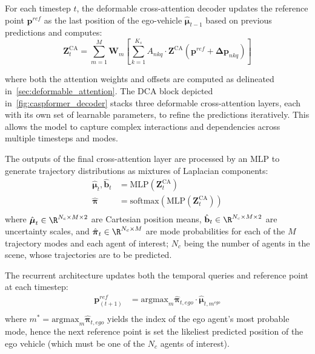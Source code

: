 \begin{description}[leftmargin=1em,itemsep=2pt]
\begin{description}[leftmargin=1em,itemsep=2pt]
For each timestep \(t\), the deformable cross-attention decoder updates the reference point \(\mathbf{p}^{ref}\) as the last position of the ego-vehicle \( \hat{\boldsymbol{\mu}}_{t-1}\) based on previous predictions and computes:
\begin{equation}
\label{eq:cross_attention_operation}
\mathbf{Z}^{\text{CA}}_t = \sum_{m=1}^{M} \mathbf{W}_m \left[ \sum_{k=1}^{K_s} A_{nkq} \cdot \mathbf{Z}^{\text{CA}}(\mathbf{p}^{ref} + \boldsymbol{\Delta p}_{nkq}) \right]
\end{equation}

where both the attention weights and offsets are computed as delineated in~\autoref{sec:deformable_attention}. The DCA block depicted in~\autoref{fig:caspformer_decoder} stacks three deformable cross-attention layers, each with its own set of learnable parameters, to refine the predictions iteratively. This allows the model to capture complex interactions and dependencies across multiple timesteps and modes.

\item[Autoregressive Decoding with Mixture Outputs.] The outputs of the final cross-attention layer are processed by an MLP to generate trajectory distributions as mixtures of Laplacian components:
\begin{equation}
\label{eq:mixture_trajectory_output}
\begin{aligned}
\hat{\boldsymbol{\mu}}_{t}, \hat{\mathbf{b}}_{t} &= \text{MLP}(\mathbf{Z}^{\text{CA}}_t)\\
\hat{\boldsymbol{\pi}} &= \text{softmax}(\text{MLP}(\mathbf{Z}^{\text{CA}}_t)) \\
\end{aligned}
\end{equation}
where \(\hat{\boldsymbol{\mu}}_{t} \in \R^{N_c \times M \times 2}\) are Cartesian position means, \(\hat{\mathbf{b}}_{t} \in \R^{N_c \times M \times 2}\) are uncertainty scales, and \(\hat{\boldsymbol{\pi}}_t \in \R^{N_c \times M}\) are mode probabilities for each of the \(M\) trajectory modes and each agent of interest; \( N_c \) being the number of agents in the scene, whose trajectories are to be predicted.

The recurrent architecture updates both the temporal queries and reference point at each timestep:
\begin{equation}
\label{eq:recurrent_updates}
\begin{aligned}
\mathbf{p}^{ref}_{(t+1)} &= \text{argmax}_m \hat{\boldsymbol{\pi}}_{t,ego} \cdot \hat{\boldsymbol{\mu}}_{t,m^{ego}} \\
\end{aligned}
\end{equation}
where \(m^* = \text{argmax}_m \hat{\boldsymbol{\pi}}_{t,ego}\) yields the index of the ego agent's most probable mode, hence the next reference point is set the likeliest predicted position of the ego vehicle (which must be one of the \( N_c \) agents of interest).
\end{description}


\end{description}
